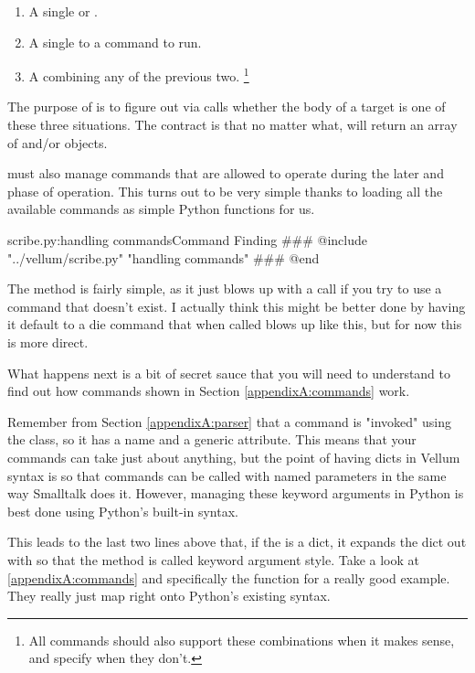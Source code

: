 \begin{enumerate}
\item A single  or .
\item A single  to a command to run.
\item A  combining any of the previous two.
    \footnote{All commands should also support these combinations when it makes
        sense, and specify when they don't.}
\end{enumerate}

The purpose of  is to figure out via 
calls whether the body of a target is one of these three situations.  The
contract is that no matter what,  will return an array of
 and/or  objects.

 must also manage commands that are allowed to operate during the
later  and  phase of operation.  This turns out
to be very simple thanks to  loading all the available commands as
simple Python functions for us.

\begin{code}{scribe.py:handling commands}{Command Finding}
### @include "../vellum/scribe.py" "handling commands"
### @end
\end{code}

The  method is fairly simple, as it just blows up with a
 call if you try to use a command that doesn't exist.  I actually
think this might be better done by having it default to a die command that when
called blows up like this, but for now this is more direct.

What happens next is a bit of secret sauce that you will need to understand to
find out how commands shown in Section \ref{appendixA:commands} work.  

Remember
from Section \ref{appendixA:parser} that a command is "invoked" using the
 class, so it has a name and a generic  attribute.
This means that your commands can take just about anything, but the point of
having dicts in Vellum syntax is so that commands can
be called with named parameters in the same way Smalltalk does it.  However,
managing these keyword arguments in Python is best done using Python's built-in
syntax.

This leads to the last two lines above that, if the  is a dict, it
expands the dict out with  so that the method is called keyword
argument style.  Take a look at \ref{appendixA:commands} and specifically the
 function for a really good example.  They really just map right
onto Python's existing syntax.

